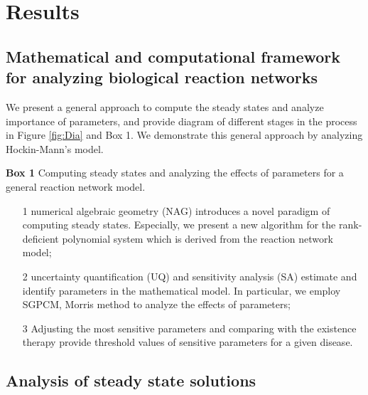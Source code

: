 \section*{Results}
\label{sec:results}

\subsection*{Mathematical and computational framework for analyzing biological reaction networks}
We present a general approach to compute the steady states and
analyze importance of parameters, and provide diagram of different
stages in the process in Figure \ref{fig:Dia} and Box 1.
We demonstrate this general approach by analyzing Hockin-Mann's model.


\begin{algorithm}[H]
\SetAlgoLined
{\bf Box 1} Computing
steady states and analyzing the effects of parameters for a general reaction network model.
\begin{itemize}
  \item[1] numerical algebraic geometry
(NAG) introduces a novel paradigm of computing steady states.
Especially, we present a new algorithm for the rank-deficient
polynomial system which is derived from the reaction network model;
\item[2] uncertainty quantification (UQ) and sensitivity analysis (SA)
estimate and identify parameters in the mathematical model. In
particular, we employ SGPCM, Morris method to analyze the effects of
parameters;
\item[3] Adjusting the most sensitive parameters and comparing with the existence
therapy provide  threshold values of sensitive parameters for a given
disease.
\end{itemize}
\end{algorithm}
\subsection*{Analysis of steady state solutions}
\label{sec:res}

